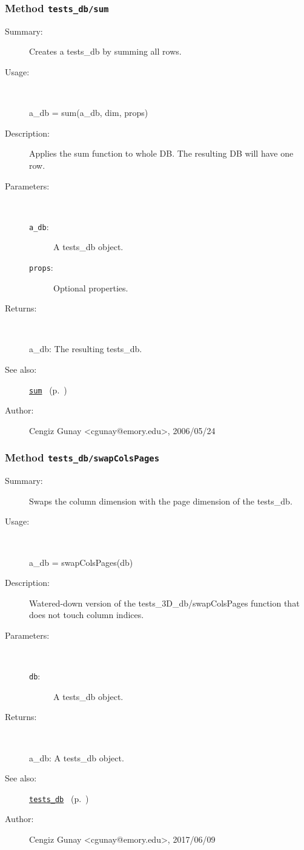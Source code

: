 \subsubsection[Method \texttt{sum}]{Method \texttt{tests\_db/sum}}%
%
\label{ref_tests_db__sum}%
\hypertarget{ref_tests_db__sum}{}%
\begin{description}
\item[Summary:]Creates a tests\_db by summing all rows.
%
\item[Usage:]~%
\begin{lyxcode}%
a\_db = sum(a\_db, dim, props)
%
\end{lyxcode}%
%
\item[Description:]%
Applies the sum function to whole DB. The resulting DB will have one row.
\item[Parameters:]~
\begin{description}%
\item[\texttt{a\_db}:]
 A tests\_db object.
\item[\texttt{props}:]
 Optional properties.
\end{description}%
%
\item[Returns:
]~

	a\_db: The resulting tests\_db.
%
%
\item[See also:]%
\hyperlink{ref_sum}{\texttt{sum}}%
\ (p.~\pageref{ref_sum})%
%
%
\item[Author:]%
Cengiz Gunay <cgunay@emory.edu>, 2006/05/24
%
\end{description}
\methodline%
\subsubsection[Method \texttt{swapColsPages}]{Method \texttt{tests\_db/swapColsPages}}%
%
\label{ref_tests_db__swapColsPages}%
\hypertarget{ref_tests_db__swapColsPages}{}%
\begin{description}
\item[Summary:]Swaps the column dimension with the page dimension of the tests\_db.
%
\item[Usage:]~%
\begin{lyxcode}%
a\_db = swapColsPages(db)
%
\end{lyxcode}%
%
\item[Description:]%
Watered-down version of the tests\_3D\_db/swapColsPages function that
 does not touch column indices. 
\item[Parameters:]~
\begin{description}%
\item[\texttt{db}:]
 A tests\_db object.
\end{description}%
%
\item[Returns:
]~

	a\_db: A tests\_db object.
%
%
\item[See also:]%
\hyperlink{ref_tests_db}{\texttt{tests\_db}}%
\ (p.~\pageref{ref_tests_db})%
%
%
\item[Author:]%
Cengiz Gunay <cgunay@emory.edu>, 2017/06/09
%
\end{description}
\methodline%
